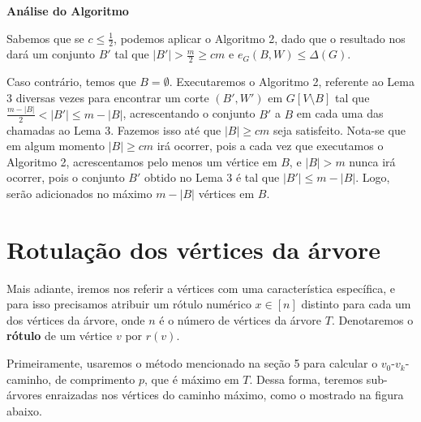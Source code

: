 \documentclass[a4paper,12pt]{article}
\begin{document}
\bigskip
\bigskip

\textbf{Análise do Algoritmo}

	Sabemos que se $c \le \frac{1}{2}$, podemos aplicar o Algoritmo 2, 
	dado que o resultado nos dará um conjunto $B'$ tal que
	$|B'|>\frac{m}{2}\ge cm$ e $e_G(B,W)\le \Delta(G)$.

	Caso contrário, temos que $B = \emptyset$.
	Executaremos o Algoritmo 2, referente ao Lema 3 diversas vezes para 
	encontrar 
	um corte $(B',W')$ em $G[V\setminus B]$ tal que $\frac{m-|B|}{2}<|B'|\le m-|B|$,
	acrescentando o conjunto $B'$ a $B$ em cada uma das chamadas ao Lema 3.
	Fazemos isso até que $|B|\ge cm$ seja satisfeito.
	Nota-se que em algum momento $|B|\ge cm$ irá ocorrer, pois a cada vez
	que executamos o Algoritmo 2, acrescentamos pelo menos um vértice em $B$,
	e $|B|>m$ nunca irá ocorrer, pois o conjunto $B'$ obtido no Lema 3 é
	tal que $|B'|\le m-|B|$. Logo, serão adicionados no máximo 
	$m-|B|$ vértices em $B$.

\newpage

\section {Rotulação dos vértices da árvore}

	Mais adiante, iremos nos referir a vértices com uma característica 
	específica, e para isso precisamos atribuir um rótulo numérico $x\in [n]$ 
	distinto para cada um dos vértices da árvore, onde $n$ é o número de 
	vértices da árvore $T$. 
	Denotaremos o \textbf{rótulo} de um vértice $v$ por $r(v)$.

	Primeiramente, usaremos o método mencionado na seção 5 para
	calcular o $v_0$-$v_k$-caminho, de comprimento $p$, 
	que é máximo em $T$. 
	Dessa forma, teremos sub-árvores enraizadas nos vértices do
	caminho máximo, como o mostrado na figura abaixo.
	

	\begin{center}  \end{center}
\end{document}
